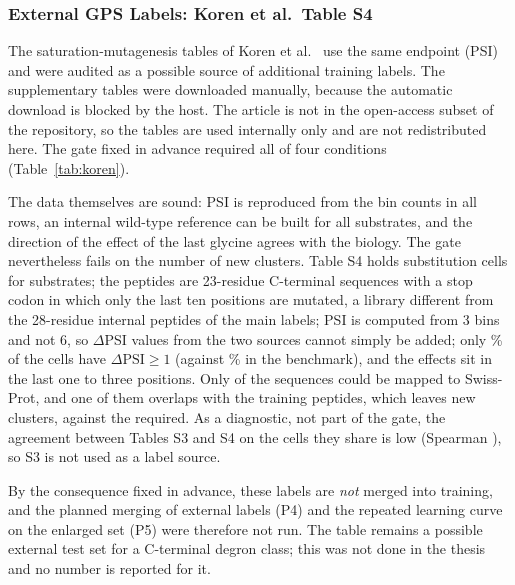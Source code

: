 \subsubsection{External GPS Labels: Koren et al.\ Table S4}\label{sec:res-koren}
The saturation-mutagenesis tables of Koren et al.\ \citep{koren2018} use the same endpoint (PSI) and were audited as a possible source of additional training labels.
The supplementary tables were downloaded manually, because the automatic download is blocked by the host. The article is not in the open-access subset of the
repository, so the tables are used internally only and are not redistributed here. The gate fixed in advance required all of four conditions (Table~\ref{tab:koren}).

The data themselves are sound: PSI is reproduced from the bin counts in all rows, an internal wild-type reference can be built for all substrates, and the
direction of the effect of the last glycine agrees with the biology. The gate nevertheless fails on the number of new clusters. Table S4 holds \nKoCells{} substitution cells for \nKoNSubstrates{} substrates;
the peptides are 23-residue C-terminal sequences with a stop codon in which only the last ten positions are mutated, a library different from the 28-residue internal peptides of the main
labels; PSI is computed from 3 bins and not 6, so $\Delta$PSI values from the two sources cannot simply be added; only \nKoPos\% of the cells have $\Delta\mathrm{PSI}\ge1$ (against \nKoZhangPos\% in the benchmark),
and the effects sit in the last one to three positions. Only \nKoMapped{} of the \nKoNSeq{} sequences could be mapped to Swiss-Prot, and one of them overlaps with the training peptides, which leaves
\nKoNewClusters{} new clusters, against the \nKoMinClusters{} required. As a diagnostic, not part of the gate, the agreement between Tables S3 and S4 on the \nKoNOverlap{} cells they share is low (Spearman \nKoSpearman{}), so S3
is not used as a label source.

\begin{table}[htbp]
  \centering
  \caption[Gate fixed in advance for merging the labels of Koren et al.\ (Table S4) into training]{Gate fixed in advance for merging the labels of Koren et al.\ (Table S4) into training}\label{tab:koren}
  
\end{table}


By the consequence fixed in advance, these labels are \emph{not} merged into training, and the planned merging of external labels (P4) and the repeated learning curve on the enlarged set (P5) were
therefore not run. The table remains a possible external test set for a C-terminal degron class; this was not done in the thesis and no number is reported for it.

